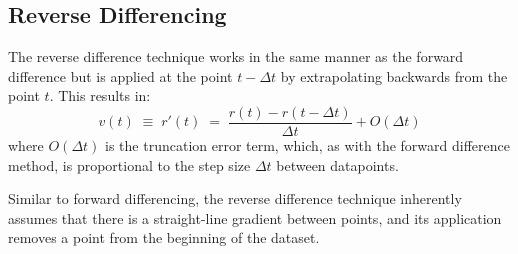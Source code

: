 \documentclass[namedreferences]{SolarPhysics}
\begin{document}
\begin{article}
\subsection{Reverse Differencing}
\label{sect_reverse}

The reverse difference technique works in the same manner as the forward difference but is applied at the point $t - \Delta t$ by extrapolating backwards from the point $t$. This results in:
\begin{equation}
v(t) \; \equiv \; r'(t) \; = \; \frac{r(t ) - r(t - \Delta t)}{\Delta t} + O(\Delta t)
\end{equation}
where $O(\Delta t)$ is the truncation error term, which, as with the forward difference method, is proportional to the step size $\Delta t$ between datapoints.




Similar to forward differencing, the reverse difference technique inherently assumes that there is a straight-line gradient between points, and its application removes a point from the beginning of the dataset. 


\end{article}
\end{document}
